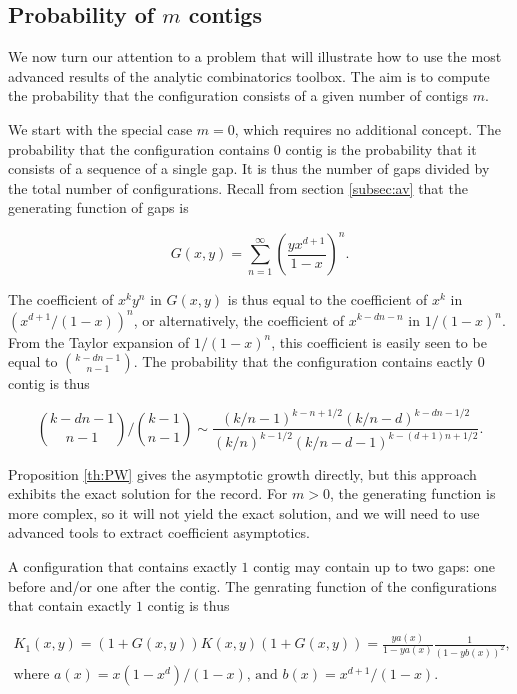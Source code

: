 \documentclass{article}
\begin{document}
\subsection{Probability of $m$ contigs}
\label{subsec:probmcontigs}

We now turn our attention to a problem that will illustrate how to use the
most advanced results of the analytic combinatorics toolbox. The aim
is to compute the probability that the configuration consists of a
given number of contigs $m$.

We start with the special case $m = 0$, which requires no additional
concept. The probability that the configuration contains $0$ contig is the
probability that it consists of a sequence of a single gap. It is thus the
number of gaps divided by the total number of configurations. Recall from
section \ref{subsec:av} that the generating function of gaps is

\begin{equation*}
G(x,y) = \sum_{n=1}^\infty \left( \frac{yx^{d+1}}{1-x} \right )^n.
\end{equation*}

The coefficient of $x^ky^n$ in $G(x,y)$ is thus equal to the coefficient
of $x^k$ in $\left(x^{d+1}/(1-x)\right)^n$, or alternatively, the
coefficient of $x^{k-dn-n}$ in $1/(1-x)^n$. From the Taylor expansion of
$1/(1-x)^n$, this coefficient is easily seen to be equal to ${k-dn-1
\choose n-1}$. The probability that the configuration contains eactly $0$
contig is thus

\begin{equation}
\label{eq:m=0}
{k-dn-1 \choose n-1} \Big/ {k-1 \choose n-1} \sim 
\frac{(k/n-1)^{k-n+1/2}(k/n-d)^{k-dn-1/2}}
 {(k/n)^{k-1/2}(k/n-d-1)^{k-(d+1)n+1/2}}.
\end{equation}

Proposition \ref{th:PW} gives the asymptotic growth directly, but this
approach exhibits the exact solution for the record. For $m > 0$, the
generating function is more complex, so it will not yield the exact
solution, and we will need to use advanced tools to extract coefficient
asymptotics.

A configuration that contains exactly $1$ contig may contain up to two
gaps: one before and/or one after the contig. The genrating function of
the configurations that contain exactly $1$ contig is thus

\begin{gather*}
K_1(x,y) = (1+G(x,y))K(x,y)(1+G(x,y)) =
\frac{ya(x)}{1-ya(x)}
\frac{1}{\left(1-yb(x)\right)^2}, \\
\text{where $a(x) = x(1-x^d)/(1-x)$, and $b(x) = x^{d+1}/(1-x)$}.
\end{gather*}
\end{document}
